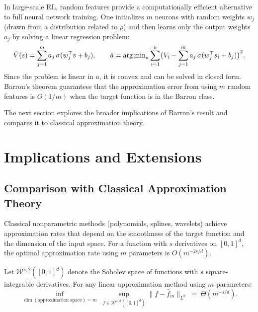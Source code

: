 \documentclass[11pt,a4paper]{article}
\begin{document}
\begin{rlconnection}[title={Random Features in RL}]
In large-scale RL, random features provide a computationally efficient
alternative to full neural network training.  One initializes $m$ neurons
with random weights $w_j$ (drawn from a distribution related to $\rho$)
and then learns only the output weights $a_j$ by solving a linear
regression problem:
\[
  \hat{V}(s) = \sum_{j=1}^m a_j \, \sigma(w_j^\top s + b_j),
  \qquad
  \hat{a} = \operatorname{arg\,min}_a \sum_{i=1}^n \bigl( V_i - \sum_{j=1}^m a_j \,
  \sigma(w_j^\top s_i + b_j) \bigr)^2.
\]
Since the problem is linear in $a$, it is convex and can be solved in
closed form.  Barron's theorem guarantees that the approximation error
from using $m$ random features is $O(1/m)$ when the target function is in
the Barron class.
\end{rlconnection}

The next section explores the broader implications of Barron's result and
compares it to classical approximation theory.

\section{Implications and Extensions}
\label{sec:implications}

\subsection{Comparison with Classical Approximation Theory}
\label{sec:classical-comparison}

Classical nonparametric methods (polynomials, splines, wavelets) achieve
approximation rates that depend on the smoothness of the target function
and the dimension of the input space.  For a function with $s$ derivatives
on $[0,1]^d$, the optimal approximation rate using $m$ parameters is
$O(m^{-2s/d})$.

\begin{proposition}
\label{prop:classical-rates}
Let $\mathcal{W}^{s,2}([0,1]^d)$ denote the Sobolev space of functions
with $s$ square-integrable derivatives.  For any linear approximation
method using $m$ parameters:
\[
  \inf_{\dim(\text{approximation space}) = m} \;
  \sup_{f \in \mathcal{W}^{s,2}([0,1]^d)}
  \|f - \hat{f}_m\|_{L^2}
  \;=\; \Theta(m^{-s/d}).
\]
\end{proposition}
\end{document}
